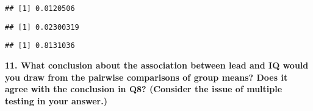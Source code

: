 \documentclass[
]{article}
\newenvironment{Shaded}{\begin{snugshade}}{\end{snugshade}}
\newcommand{\AttributeTok}[1]{\textcolor[rgb]{0.77,0.63,0.00}{#1}}
\newcommand{\DecValTok}[1]{\textcolor[rgb]{0.00,0.00,0.81}{#1}}
\newcommand{\FunctionTok}[1]{\textcolor[rgb]{0.00,0.00,0.00}{#1}}
\newcommand{\NormalTok}[1]{#1}
\newcommand{\OtherTok}[1]{\textcolor[rgb]{0.56,0.35,0.01}{#1}}
\newcommand{\SpecialCharTok}[1]{\textcolor[rgb]{0.00,0.00,0.00}{#1}}
\begin{document}
\begin{Shaded}
\end{Shaded}

\begin{verbatim}
## [1] 0.0120506
\end{verbatim}

\begin{Shaded}
\end{Shaded}

\begin{verbatim}
## [1] 0.02300319
\end{verbatim}

\begin{Shaded}
\end{Shaded}

\begin{verbatim}
## [1] 0.8131036
\end{verbatim}

\textbf{11. What conclusion about the association between lead and IQ
would you draw from the pairwise comparisons of group means? Does it
agree with the conclusion in Q8? (Consider the issue of multiple testing
in your answer.)}
\end{document}
